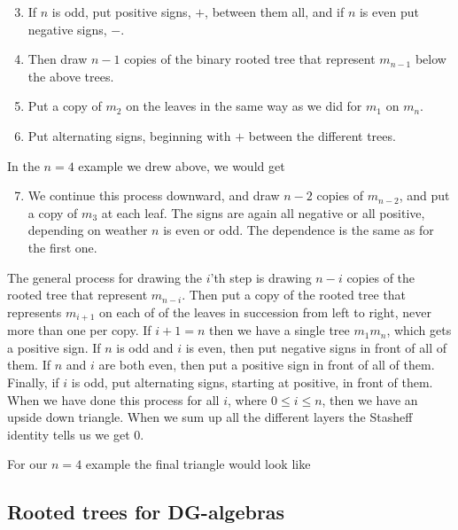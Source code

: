 

\begin{enumerate}
\setcounter{enumi}{2}
    \item If $n$ is odd, put positive signs, $+$, between them all, and if $n$ is even put negative signs, $-$. 
    \item Then draw $n-1$ copies of the binary rooted tree that represent $m_{n-1}$ below the above trees. \item Put a copy of $m_2$ on the leaves in the same way as we did for $m_1$ on $m_n$.
    \item Put alternating signs, beginning with $+$ between the different trees.
\end{enumerate}

In the $n=4$ example we drew above, we would get


\begin{enumerate}
\setcounter{enumi}{6}
    \item We continue this process downward, and draw $n-2$ copies of $m_{n-2}$, and put a copy of $m_3$ at each leaf. The signs are again all negative or all positive, depending on weather $n$ is even or odd. The dependence is the same as for the first one. 
\end{enumerate}

The general process for drawing the $i$'th step is drawing $n-i$ copies of the rooted tree that represent $m_{n-i}$. Then put a copy of the rooted tree that represents $m_{i+1}$ on each of of the leaves in succession from left to right, never more than one per copy. If $i+1=n$ then we have a single tree $m_1 m_{n}$, which gets a positive sign. If $n$ is odd and $i$ is even, then put negative signs in front of all of them. If $n$ and $i$ are both even, then put a positive sign in front of all of them. Finally, if $i$ is odd, put alternating signs, starting at positive, in front of them. When we have done this process for all $i$, where $0\leq i \leq n$, then we have an upside down triangle. When we sum up all the different layers the Stasheff identity tells us we get $0$. 

For our $n=4$ example the final triangle would look like



\subsection*{Rooted trees for DG-algebras}

